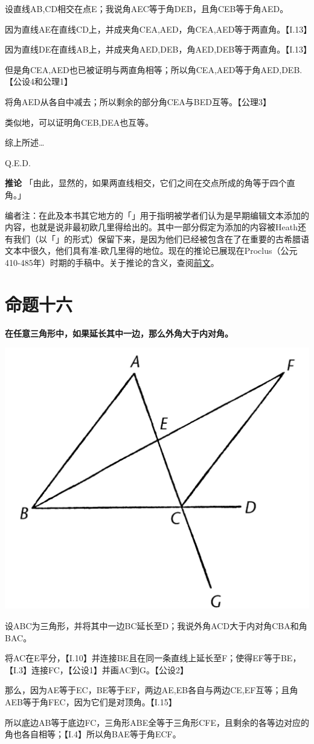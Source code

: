 \documentclass[
]{book}
\begin{document}
设直线AB,CD相交在点E；我说角AEC等于角DEB，且角CEB等于角AED。

因为直线AE在直线CD上，并成夹角CEA,AED，角CEA,AED等于两直角。【I.13】

因为直线DE在直线AB上，并成夹角AED,DEB，角AED,DEB等于两直角。【I.13】

但是角CEA,AED也已被证明与两直角相等；所以角CEA,AED等于角AED,DEB.【公设4和公理1】

将角AED从各自中减去；所以剩余的部分角CEA与BED互等。【公理3】

类似地，可以证明角CEB,DEA也互等。

综上所述\ldots{}

Q.E.D.

\textbf{推论} 「由此，显然的，如果两直线相交，它们之间在交点所成的角等于四个直角。」

编者注：在此及本书其它地方的「」用于指明被学者们认为是早期编辑文本添加的内容，也就是说非最初欧几里得给出的。其中一部分假定为添加的内容被Heath还有我们（以「」的形式）保留下来，是因为他们已经被包含在了在重要的古希腊语文本中很久，他们具有准-欧几里得的地位。现在的推论已展现在Proclus（公元410-485年）时期的手稿中。关于推论的含义，查阅\protect\hyperlink{plato}{前文}。

\hypertarget{ux547dux9898ux5341ux516d}{%
\section{命题十六}\label{ux547dux9898ux5341ux516d}}

\textbf{在任意三角形中，如果延长其中一边，那么外角大于内对角。}

\includegraphics[width=0.3\linewidth]{./image/img481}

设ABC为三角形，并将其中一边BC延长至D；我说外角ACD大于内对角CBA和角BAC。

将AC在E平分，【I.10】并连接BE且在同一条直线上延长至F；使得EF等于BE，【I.3】连接FC，【公设1】并画AC到G。【公设2】

那么，因为AE等于EC，BE等于EF，两边AE,EB各自与两边CE,EF互等；且角AEB等于角FEC，因为它们是对顶角。【I.15】

所以底边AB等于底边FC，三角形ABE全等于三角形CFE，且剩余的各等边对应的角也各自相等；【I.4】所以角BAE等于角ECF。
\end{document}
